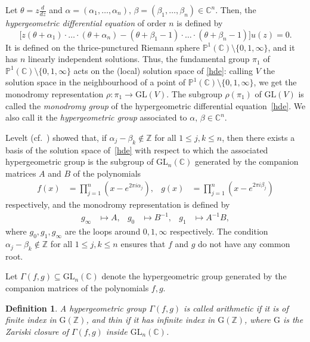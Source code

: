 \documentclass[11pt,a4paper]{amsart}
\newtheorem{defn}[thm]{Definition}
\theoremstyle{definition}
\theoremstyle{definition}
\numberwithin{equation}{section}
\begin{document}
Let $\theta=z\frac{d}{dz}$ and $\alpha=(\alpha_{1},\ldots,\alpha_{n}),\,\beta=(\beta_{1},\ldots,\beta_{n})\in\mathbb{C}^{n}.$ Then, the \textit{hypergeometric differential equation} of order $n$ is defined by
\begin{equation}\label{hde}
\big[z(\theta+\alpha_{1})\cdot\ldots\cdot(\theta+\alpha_{n})-(\theta+\beta_{1}-1)\cdot\ldots\cdot(\theta+\beta_{n}-1)\big]u(z)=0.
\end{equation}
It is defined on the thrice-punctured Riemann sphere $\mathbb{P}^{1}(\mathbb{C})\setminus\{0,1,\infty\}$, and it has $n$ linearly independent solutions. Thus, the fundamental group $\pi_{1}$ of $\mathbb{P}^{1}(\mathbb{C})\setminus\{0,1,\infty\}$ acts on the (local) solution space of \eqref{hde}: calling $V$ the solution space in the neighbourhood of a point of $\mathbb{P}^{1}(\mathbb{C})\setminus\{0,1,\infty\}$, we get the monodromy representation $\rho:\pi_{1}\rightarrow\mathrm{GL}(V)$. The subgroup $\rho(\pi_{1})$ of $\mathrm{GL}(V)$ is called the \textit{monodromy group} of the hypergeometric differential equation~\eqref{hde}. We also call it the \textit{hypergeometric group} associated to $\alpha,\,\beta\in\mathbb{C}^{n}$.

Levelt (cf.~\cite[Thm.~3.5]{BH}) showed that, if $\alpha_{j}-\beta_{k}\notin\mathbb{Z}$ for all $1\leq j,k\leq n$, then there exists a basis of the solution space of~\eqref{hde} with respect to which the associated hypergeometric group is the subgroup of $\mathrm{GL}_{n}(\mathbb{C})$ generated by the companion matrices $A$ and $B$ of the polynomials
\begin{align*}
f(x) & =\prod_{j=1}^{n}(x-e^{2\pi i\alpha_{j}}), & g(x) & =\prod_{j=1}^{n}(x-e^{2\pi i\beta_{j}})
\end{align*}
respectively, and the monodromy representation is defined by
\begin{align}\label{eq:monodromy}
g_{\infty} & \mapsto A, & g_{0} & \mapsto B^{-1}, & g_{1} & \mapsto A^{-1}B, 
\end{align}
where $g_{0},g_{1},g_{\infty}$ are the loops around $0,1,\infty$ respectively. The condition $\alpha_{j}-\beta_{k}\notin\mathbb{Z}$ for all $1\leq j,k\leq n$ ensures that $f$ and $g$ do not have any common root.

Let $\Gamma(f,g)\subseteq\mathrm{GL}_{n}(\mathbb{C})$ denote the hypergeometric group generated by the companion matrices of the polynomials $f,g$.

\begin{defn}\label{defn:at}
A hypergeometric group $\Gamma(f,g)$ is called arithmetic if it is of finite index in $\mathrm{G}(\mathbb{Z})$, and thin if it has infinite index in $\mathrm{G}(\mathbb{Z})$, where $\mathrm{G}$ is the Zariski closure of $\Gamma(f,g)$ inside $\mathrm{GL}_{n}(\mathbb{C})$.
\end{defn}
\end{document}
